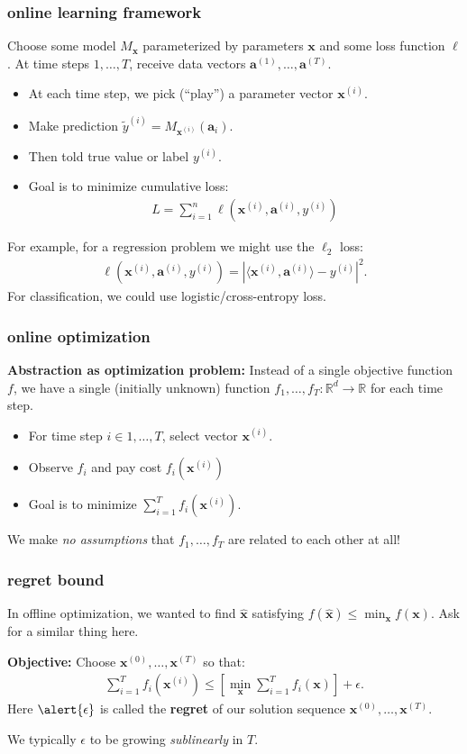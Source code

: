 \documentclass[compress]{beamer}
\newcommand{\bv}[1]{\mathbf{#1}}
\newcommand{\R}{\mathbb{R}}
\begin{document}
\begin{frame}
	\frametitle{online learning framework}
	Choose some model $M_\bv{x}$ parameterized by parameters $\bv{x}$ and some loss function $\ell$. 
	At time steps $1,\ldots, T$, receive data vectors $\bv{a}^{(1)}, \ldots, \bv{a}^{(T)}$. 
	\begin{itemize}
		\item At each time step, we pick (``play'') a parameter vector $\bv{x}^{(i)}$.
		\item Make prediction $\tilde{y}^{(i)} = M_{\bv{x}^{(i)}}(\bv{a}_i)$.
		\item Then told true value or label $y^{(i)}$. 
		\item Goal is to minimize cumulative loss:
		\begin{align*}
			L = \sum_{i=1}^n \ell(\bv{x}^{(i)}, \bv{a}^{(i)}, y^{(i)})
		\end{align*} 
	\end{itemize}
	For example, for a regression problem we might use the $\ell_2$ loss:
	\begin{align*}
		\ell(\bv{x}^{(i)}, \bv{a}^{(i)}, y^{(i)}) = \left|\langle\bv{x}^{(i)},\bv{a}^{(i)}\rangle - y^{(i)}\right|^2. 
	\end{align*}
For classification, we could use logistic/cross-entropy loss. 
\end{frame}

\begin{frame}
	\frametitle{online optimization}
	\textbf{Abstraction as optimization problem:} Instead of a single objective function $f$, we have a single (initially unknown) function $f_1, \ldots, f_T: \R^d \rightarrow \R$ for each time step. 
	\begin{itemize}
		\item For time step $i\in 1,\ldots, T$, select vector $\bv{x}^{(i)}$.
		\item Observe $f_i$ and pay cost $f_i(\bv{x}^{(i)})$
		\item Goal is to minimize $\sum_{i=1}^T f_i(\bv{x}^{(i)})$. 
	\end{itemize}

	\begin{center}
		We make \emph{no assumptions} that $f_1, \ldots, f_T$ are related to each other at all!
	\end{center}
\end{frame}

\begin{frame}[t]
	\frametitle{regret bound}
	In offline optimization, we wanted to find $\hat{\bv{x}}$ satisfying $f(\hat{\bv{x}}) \leq \min_{\bv{x}} f(\bv{x})$. Ask for a similar thing here. 
	
	\textbf{Objective:} Choose $\bv{x}^{(0)}, \ldots, \bv{x}^{(T)}$ so that: 
	\begin{align*}
		\sum_{i=1}^T f_i(\bv{x}^{(i)}) \leq \left[\min_\bv{x} \sum_{i=1}^T f_i(\bv{x})\right] + \epsilon.
	\end{align*}
	Here $\alert{\epsilon}$ is called the \alert{\textbf{regret}} of our solution sequence $\bv{x}^{(0)}, \ldots, \bv{x}^{(T)}$.
	
	We typically $\epsilon$ to be growing \emph{sublinearly} in $T$. 
\end{frame}
\end{document}
